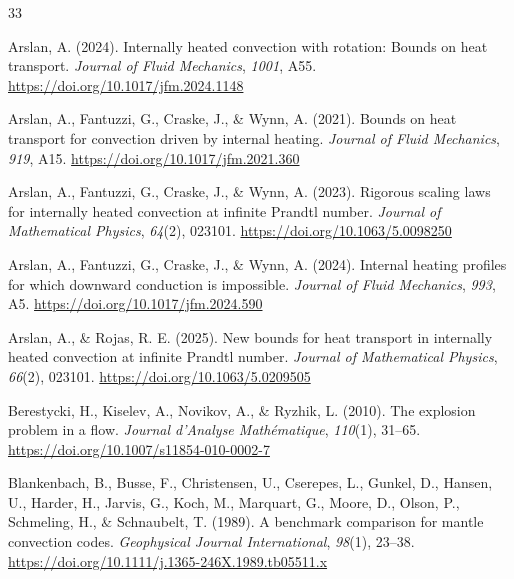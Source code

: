 \begin{thebibliography}{33}

\providecommand{\natexlab}[1]{#1}

\setlength{\itemsep}{2pt}

Arslan, A. (2024). Internally heated convection with rotation: Bounds on heat transport. \emph{Journal of Fluid Mechanics}, \emph{1001}, A55. \url{https://doi.org/10.1017/jfm.2024.1148}

Arslan, A., Fantuzzi, G., Craske, J., \& Wynn, A. (2021). Bounds on heat transport for convection driven by internal heating. \emph{Journal of Fluid Mechanics}, \emph{919}, A15. \url{https://doi.org/10.1017/jfm.2021.360}

Arslan, A., Fantuzzi, G., Craske, J., \& Wynn, A. (2023). Rigorous scaling laws for internally heated convection at infinite Prandtl number. \emph{Journal of Mathematical Physics}, \emph{64}(2), 023101. \url{https://doi.org/10.1063/5.0098250}

Arslan, A., Fantuzzi, G., Craske, J., \& Wynn, A. (2024). Internal heating profiles for which downward conduction is impossible. \emph{Journal of Fluid Mechanics}, \emph{993}, A5. \url{https://doi.org/10.1017/jfm.2024.590}

Arslan, A., \& Rojas, R. E. (2025). New bounds for heat transport in internally heated convection at infinite Prandtl number. \emph{Journal of Mathematical Physics}, \emph{66}(2), 023101. \url{https://doi.org/10.1063/5.0209505}

Berestycki, H., Kiselev, A., Novikov, A., \& Ryzhik, L. (2010). The explosion problem in a flow. \emph{Journal d'Analyse Mathématique}, \emph{110}(1), 31--65. \url{https://doi.org/10.1007/s11854-010-0002-7}

Blankenbach, B., Busse, F., Christensen, U., Cserepes, L., Gunkel, D., Hansen, U., Harder, H., Jarvis, G., Koch, M., Marquart, G., Moore, D., Olson, P., Schmeling, H., \& Schnaubelt, T. (1989). A benchmark comparison for mantle convection codes. \emph{Geophysical Journal International}, \emph{98}(1), 23--38. \url{https://doi.org/10.1111/j.1365-246X.1989.tb05511.x}


\end{thebibliography}
